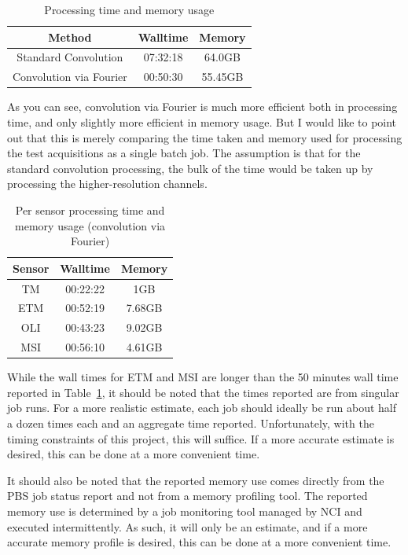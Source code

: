 \documentclass[a4paper]{article}
\begin{document}
    \begin{table}[ht!]
      \caption{Processing time and memory usage}\label{table:1}
      \centering
      \begin{tabular}{ccc} \midrule
        \textbf{Method} & \textbf{Walltime} & \textbf{Memory} \\ \midrule
        Standard Convolution & 07:32:18 & 64.0GB \\
        Convolution via Fourier & 00:50:30 & 55.45GB \\ \midrule
      \end{tabular}
    \end{table}

    \begin{flushleft}
      As you can see, convolution via Fourier is much more efficient both in processing time, and only slightly more efficient in memory usage. But I would like to point out that this is merely comparing the time taken and memory used for processing the test acquisitions as a single batch job. The assumption is that for the standard convolution processing, the bulk of the time would be taken up by processing the higher-resolution channels.
    \end{flushleft}

    \begin{table}[ht!]
      \caption{Per sensor processing time and memory usage (convolution via Fourier)}\label{table:2}
      \centering
      \begin{tabular}{ccc} \midrule
        \textbf{Sensor} & \textbf{Walltime} & \textbf{Memory} \\ \midrule
        TM & 00:22:22 & 1GB \\
        ETM & 00:52:19 & 7.68GB \\
        OLI & 00:43:23 & 9.02GB \\
        MSI & 00:56:10 & 4.61GB \\ \midrule
      \end{tabular}
    \end{table}

    \begin{flushleft}
      While the wall times for ETM and MSI are longer than the 50 minutes wall time reported in Table~\ref{table:1}, it should be noted that the times reported are from singular job runs. For a more realistic estimate, each job should ideally be run about half a dozen times each and an aggregate time reported. Unfortunately, with the timing constraints of this project, this will suffice. If a more accurate estimate is desired, this can be done at a more convenient time. \par
      It should also be noted that the reported memory use comes directly from the PBS job status report and not from a memory profiling tool. The reported memory use is determined by a job monitoring tool managed by NCI and executed intermittently. As such, it will only be an estimate, and if a more accurate memory profile is desired, this can be done at a more convenient time.
    \end{flushleft}
\end{document}
